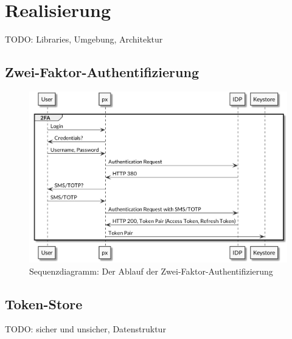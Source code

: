 \section{Realisierung}

TODO: Libraries, Umgebung, Architektur

\subsection{Zwei-Faktor-Authentifizierung}

\begin{figure}
    \centering
    \includegraphics[width=\linewidth]{pics/sequence-2fa.png}
    \caption{Sequenzdiagramm: Der Ablauf der Zwei-Faktor-Authentifizierung}
\end{figure}

\subsection{Token-Store}

TODO: sicher und unsicher, Datenstruktur
